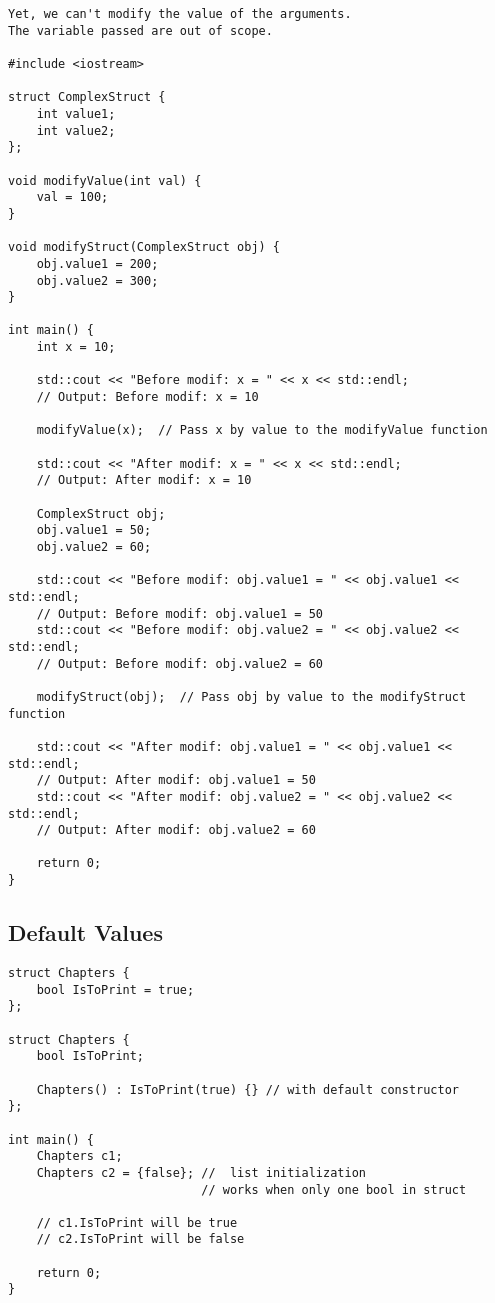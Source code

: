 \begin{verbatim}
Yet, we can't modify the value of the arguments.
The variable passed are out of scope.

#include <iostream>

struct ComplexStruct {
    int value1;
    int value2;
};

void modifyValue(int val) {
    val = 100;
}

void modifyStruct(ComplexStruct obj) {
    obj.value1 = 200;
    obj.value2 = 300;
}

int main() {
    int x = 10;

    std::cout << "Before modif: x = " << x << std::endl;  
    // Output: Before modif: x = 10

    modifyValue(x);  // Pass x by value to the modifyValue function

    std::cout << "After modif: x = " << x << std::endl;   
    // Output: After modif: x = 10

    ComplexStruct obj;
    obj.value1 = 50;
    obj.value2 = 60;

    std::cout << "Before modif: obj.value1 = " << obj.value1 << std::endl;  
    // Output: Before modif: obj.value1 = 50
    std::cout << "Before modif: obj.value2 = " << obj.value2 << std::endl;  
    // Output: Before modif: obj.value2 = 60

    modifyStruct(obj);  // Pass obj by value to the modifyStruct function

    std::cout << "After modif: obj.value1 = " << obj.value1 << std::endl;   
    // Output: After modif: obj.value1 = 50
    std::cout << "After modif: obj.value2 = " << obj.value2 << std::endl;   
    // Output: After modif: obj.value2 = 60

    return 0;
}

\end{verbatim}

\subsection{Default Values}

\begin{verbatim}
struct Chapters {
    bool IsToPrint = true;
};

struct Chapters {
    bool IsToPrint;

    Chapters() : IsToPrint(true) {} // with default constructor
};

int main() {
    Chapters c1;
    Chapters c2 = {false}; //  list initialization
                           // works when only one bool in struct

    // c1.IsToPrint will be true
    // c2.IsToPrint will be false

    return 0;
}
\end{verbatim}

